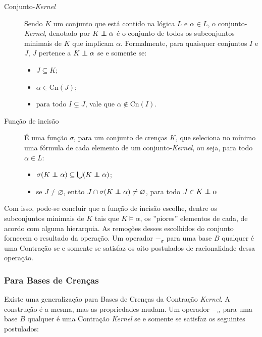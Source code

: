 \begin{description}
	\item[Conjunto-\textit{Kernel}] Sendo $ K $ um conjunto que está contido na lógica $ L $ e $ \alpha \in L $, o conjunto-\textit{Kernel}, denotado por $ K \kcont \alpha $ é o conjunto de todos os subconjuntos minimais de $ K $ que implicam $ \alpha $. Formalmente, para quaisquer conjuntos $ I $ e $ J $, $ J $ pertence a $ K \kcont \alpha $ se e somente se:
	\begin{itemize}
		\item $ J \subseteq K $;
		\item $ \alpha \in \text{Cn}(J) $;
		\item para todo $ I \subsetneq J $, vale que $ \alpha \notin \text{Cn}(I) $.
	\end{itemize} 	
	\item[Função de incisão] É uma função $ \sigma $, para um conjunto de crenças $ K $, que seleciona no mínimo uma fórmula de cada elemento de um conjunto-\textit{Kernel}, ou seja, para todo $ \alpha \in L $:
	\begin{itemize}
		\item $ \sigma (K \kcont \alpha) \subseteq \bigcup(K \kcont \alpha) $;
		\item se $ J \neq \varnothing $, então $ J \cap \sigma(K \kcont \alpha) \neq \varnothing $, para todo $ J \in K \kcont \alpha $
	\end{itemize}
\end{description}

Com isso, pode-se concluir que a função de incisão escolhe, dentre os subconjuntos minimais de $ K $ tais que $ K \models \alpha $, os ''piores'' elementos de cada, de acordo com alguma hierarquia. As remoções desses escolhidos do conjunto fornecem o resultado da operação. Um operador $ -_{\sigma} $ para uma base $ B $ qualquer é uma Contração se e somente se satisfaz os oito postulados de racionalidade dessa operação.

\subsubsection{Para Bases de Crenças}

Existe uma generalização para Bases de Crenças da Contração \textit{Kernel}. A construção é a mesma, mas as propriedades mudam. Um operador $ -_{\sigma} $ para uma base $ B $ qualquer é uma Contração \textit{Kernel} se e somente se satisfaz os seguintes postulados:

